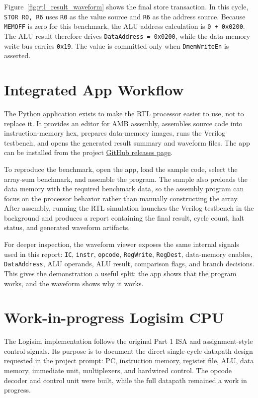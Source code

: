 \documentclass[12pt,a4paper]{article}
\begin{document}
Figure~\ref{fig:rtl_result_waveform} shows the final store transaction. In this cycle, \texttt{STOR R0, R6} uses \texttt{R0} as the value source and \texttt{R6} as the address source. Because \texttt{MEMOFF} is zero for this benchmark, the ALU address calculation is \texttt{0 + 0x0200}. The ALU result therefore drives \texttt{DataAddress = 0x0200}, while the data-memory write bus carries \texttt{0x19}. The value is committed only when \texttt{DmemWriteEn} is asserted.

\section{Integrated App Workflow}

The Python application exists to make the RTL processor easier to use, not to replace it. It provides an editor for AMB assembly, assembles source code into instruction-memory hex, prepares data-memory images, runs the Verilog testbench, and opens the generated result summary and waveform files. The app can be installed from the project \href{https://github.com/IsmailAlrida/amb-processor/releases/tag/latest}{GitHub releases page}.

To reproduce the benchmark, open the app, load the sample code, select the array-sum benchmark, and assemble the program. The sample also preloads the data memory with the required benchmark data, so the assembly program can focus on the processor behavior rather than manually constructing the array. After assembly, running the RTL simulation launches the Verilog testbench in the background and produces a report containing the final result, cycle count, halt status, and generated waveform artifacts.

For deeper inspection, the waveform viewer exposes the same internal signals used in this report: \texttt{IC}, \texttt{instr}, \texttt{opcode}, \texttt{RegWrite}, \texttt{RegDest}, data-memory enables, \texttt{DataAddress}, ALU operands, ALU result, comparison flags, and branch decisions. This gives the demonstration a useful split: the app shows that the program works, and the waveform shows why it works.

\section{Work-in-progress Logisim CPU}

The Logisim implementation follows the original Part 1 ISA and assignment-style control signals. Its purpose is to document the direct single-cycle datapath design requested in the project prompt: PC, instruction memory, register file, ALU, data memory, immediate unit, multiplexers, and hardwired control. The opcode decoder and control unit were built, while the full datapath remained a work in progress.
\end{document}
